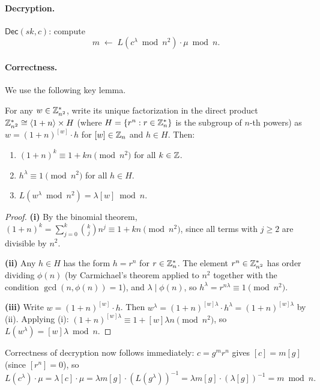 \paragraph{Decryption.}
$\mathsf{Dec}(sk, c)$: compute
\[
  m \;\gets\; L\!\left(c^\lambda \bmod n^2\right) \cdot \mu \bmod n.
\]

\paragraph{Correctness.}
We use the following key lemma.

\begin{lemma}
\label{lem:binomial}
  For any $w \in \mathbb{Z}_{n^2}^*$, write its unique factorization in the direct product
  $\mathbb{Z}_{n^2}^* \cong \langle 1+n \rangle \times H$ (where $H = \{r^n : r \in \mathbb{Z}_n^*\}$ is
  the subgroup of $n$-th powers) as $w = (1+n)^{[w]} \cdot h$ for $[w] \in \mathbb{Z}_n$ and $h \in H$.
  Then:
  \begin{enumerate}
    \item $(1+n)^k \equiv 1 + kn \pmod{n^2}$ for all $k \in \mathbb{Z}$.
    \item $h^{\lambda} \equiv 1 \pmod{n^2}$ for all $h \in H$.
    \item $L(w^\lambda \bmod n^2) = \lambda [w] \bmod n$.
  \end{enumerate}
\end{lemma}

\begin{proof}
  \textbf{(i)} By the binomial theorem,
  $(1+n)^k = \sum_{j=0}^{k} \binom{k}{j} n^j \equiv 1 + kn \pmod{n^2}$,
  since all terms with $j \ge 2$ are divisible by $n^2$.

  \textbf{(ii)} Any $h \in H$ has the form $h = r^n$ for $r \in \mathbb{Z}_n^*$. The element
  $r^n \in \mathbb{Z}_{n^2}^*$ has order dividing $\phi(n)$ (by Carmichael's theorem applied to
  $n^2$ together with the condition $\gcd(n, \phi(n)) = 1$), and $\lambda \mid \phi(n)$,
  so $h^\lambda = r^{n\lambda} \equiv 1 \pmod{n^2}$.

  \textbf{(iii)} Write $w = (1+n)^{[w]} \cdot h$. Then
  $w^\lambda = (1+n)^{[w]\lambda} \cdot h^\lambda = (1+n)^{[w]\lambda}$
  by (ii). Applying (i): $(1+n)^{[w]\lambda} \equiv 1 + [w]\lambda n \pmod{n^2}$,
  so $L(w^\lambda) = [w]\lambda \bmod n$.
\end{proof}

Correctness of decryption now follows immediately: $c = g^m r^n$ gives
$[c] = m[g]$ (since $[r^n] = 0$), so
\[
  L(c^\lambda) \cdot \mu
  = \lambda[c] \cdot \mu
  = \lambda m [g] \cdot (L(g^\lambda))^{-1}
  = \lambda m [g] \cdot (\lambda [g])^{-1}
  = m \bmod n.
\]

